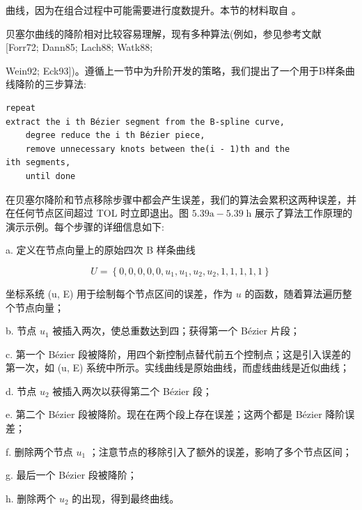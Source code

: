 \documentclass[../main.tex]{subfiles}
\begin{document}
 



 

曲线，因为在组合过程中可能需要进行度数提升。本节的材料取自 \cite{Pieg95}。

贝塞尔曲线的降阶相对比较容易理解，现有多种算法(例如，参见参考文献 [Forr72; Dann85; Lach88; Watk88;

 


Wein92; Eck93])。遵循上一节中为升阶开发的策略，我们提出了一个用于B样条曲线降阶的三步算法:

\begin{verbatim}
repeat
extract the i th Bézier segment from the B-spline curve,
    degree reduce the i th Bézier piece,
    remove unnecessary knots between the(i - 1)th and the
ith segments,
    until done
\end{verbatim}

在贝塞尔降阶和节点移除步骤中都会产生误差，我们的算法会累积这两种误差，并在任何节点区间超过 TOL 时立即退出。图 \({5.39}\mathrm{a} - {5.39}\mathrm{\;h}\) 展示了算法工作原理的演示示例。每个步骤的详细信息如下:

a. 定义在节点向量上的原始四次 B 样条曲线

\[
U = \left\{  {0,0,0,0,0,{u}_{1},{u}_{1},{u}_{2},{u}_{2},1,1,1,1,1}\right\}
\]

坐标系统 (u, E) 用于绘制每个节点区间的误差，作为 \(u\) 的函数，随着算法遍历整个节点向量；

b. 节点 \({u}_{1}\) 被插入两次，使总重数达到四；获得第一个 Bézier 片段；





c. 第一个 Bézier 段被降阶，用四个新控制点替代前五个控制点；这是引入误差的第一次，如 (u, E) 系统中所示。实线曲线是原始曲线，而虚线曲线是近似曲线；



d. 节点 \({u}_{2}\) 被插入两次以获得第二个 Bézier 段；

e. 第二个 Bézier 段被降阶。现在在两个段上存在误差；这两个都是 Bézier 降阶误差；

f. 删除两个节点 \({u}_{1}\) ；注意节点的移除引入了额外的误差，影响了多个节点区间；





g. 最后一个 Bézier 段被降阶；

h. 删除两个 \({u}_{2}\) 的出现，得到最终曲线。
\end{document}

